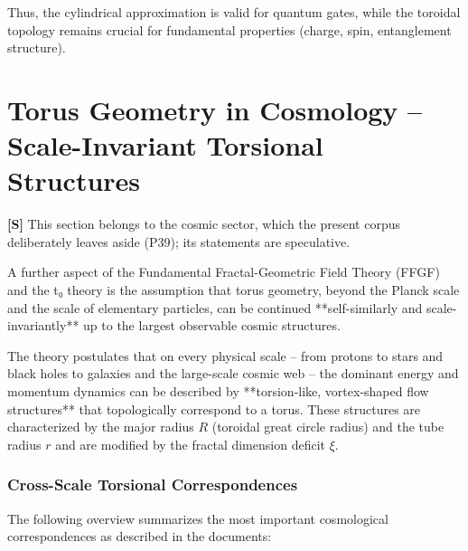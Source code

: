 Thus, the cylindrical approximation is valid for quantum gates, while 
the toroidal topology remains crucial for fundamental properties 
(charge, spin, entanglement structure).

\section{Torus Geometry in Cosmology – Scale-Invariant Torsional Structures}

\textbf{[S]} This section belongs to the cosmic sector, which the present corpus deliberately leaves aside (P39); its statements are speculative.

A further aspect of the Fundamental Fractal-Geometric Field Theory (FFGF) and the t₀ theory is the assumption that torus geometry, beyond the Planck scale and the scale of elementary particles, can be continued **self-similarly and scale-invariantly** up to the largest observable cosmic structures.

The theory postulates that on every physical scale – from protons to stars and black holes to galaxies and the large-scale cosmic web – the dominant energy and momentum dynamics can be described by **torsion-like, vortex-shaped flow structures** that topologically correspond to a torus. These structures are characterized by the major radius $R$ (toroidal great circle radius) and the tube radius $r$ and are modified by the fractal dimension deficit $\xi$.

\subsubsection{Cross-Scale Torsional Correspondences}

The following overview summarizes the most important cosmological correspondences as described in the documents:

